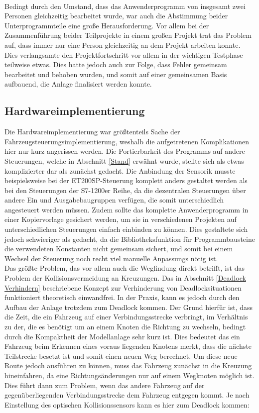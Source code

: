 		\\[4pt]
		Bedingt durch den Umstand, dass das Anwenderprogramm von insgesamt zwei Personen gleichzeitig bearbeitet wurde, war auch die Abstimmung beider Unterprogrammteile eine große Herausforderung. Vor allem bei der Zusammenführung beider Teilprojekte in einem großen Projekt trat das Problem auf, dass immer nur eine Person gleichzeitig an dem Projekt arbeiten konnte. Dies verlangsamte den Projektfortschritt vor allem in der wichtigen Testphase teilweise etwas. Dies hatte jedoch auch zur Folge, dass Fehler gemeinsam bearbeitet und behoben wurden, und somit auf einer gemeinsamen Basis aufbauend, die Anlage finalisiert werden konnte.
		
	\subsection{Hardwareimplementierung}
		\label{Probleme_Hardware}
		Die Hardwareimplementierung war größtenteils Sache der Fahrzeugsteuerungsimplementierung, weshalb die aufgetretenen Komplikationen hier nur kurz angerissen werden. Die Portierbarkeit des Programms auf andere Steuerungen, welche in Abschnitt \ref{Stand} erwähnt wurde, stellte sich als etwas komplizierter dar als zunächst gedacht. Die Anbindung der Sensorik musste beispielsweise bei der ET200SP-Steuerung komplett anders gestaltet werden als bei den Steuerungen der S7-1200er Reihe, da die dezentralen Steuerungen über andere Ein und Ausgabebaugruppen verfügen, die somit unterschiedlich angesteuert werden müssen. Zudem sollte das komplette Anwenderprogramm in einer Kopiervorlage gesichert werden, um sie in verschiedenen Projekten auf unterschiedlichen Steuerungen einfach einbinden zu können. Dies gestaltete sich jedoch schwieriger als gedacht, da die Bibliotheksfunktion für Programmbausteine die verwendeten Konstanten nicht gemeinsam sichert, und somit bei einem Wechsel der Steuerung noch recht viel manuelle Anpassungs nötig ist.
		\\[4pt]
		Das größte Problem, das vor allem auch die Wegfindung direkt betrifft, ist das Problem der Kollisionsvermeidung an Kreuzungen. Das in Abschnitt \ref{Deadlock Verhindern} beschriebene Konzept zur Verhinderung von Deadlocksituationen funktioniert theoretisch einwandfrei. In der Praxis, kann es jedoch durch den Aufbau der Anlage trotzdem zum Deadlock kommen. Der Grund hierfür ist, dass die Zeit, die ein Fahrzeug auf einer Verbindungsstrecke verbringt, im Verhältnis zu der, die es benötigt um an einem Knoten die Richtung zu wechseln, bedingt durch die Kompaktheit der Modellanlage sehr kurz ist. Dies bedeutet das ein Fahrzeug beim Erkennen eines voraus liegenden Knotens merkt, dass die nächste Teilstrecke besetzt ist und somit einen neuen Weg berechnet. Um diese neue Route jedoch ausführen zu können, muss das Fahrzeug zunächst in die Kreuzung hineinfahren, da eine Richtungsänderungen nur auf einem Wegknoten möglich ist. Dies führt dann zum Problem, wenn das andere Fahrzeug auf der gegenüberliegenden Verbindungsstrecke dem Fahrzeug entgegen kommt. Je nach Einstellung des optischen Kollisionssensors kann es hier zum Deadlock kommen:
		
